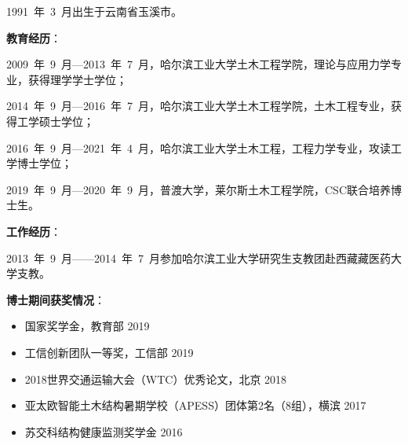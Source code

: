 
\begin{resume}
1991~年~3~月出生于云南省玉溪市。

\vspace{10pt}

\textbf{教育经历}：

2009~年~9~月---2013~年~7~月，哈尔滨工业大学土木工程学院，理论与应用力学专业，获得理学学士学位；

2014~年~9~月---2016~年~7~月，哈尔滨工业大学土木工程学院，土木工程专业，获得工学硕士学位；

2016~年~9~月---2021~年~4~月，哈尔滨工业大学土木工程，工程力学专业，攻读工学博士学位；

2019~年~9~月---2020~年~9~月，普渡大学，莱尔斯土木工程学院，CSC联合培养博士生。


\vspace{10pt}

\textbf{工作经历}：

2013~年~9~月------2014~年~7~月参加哈尔滨工业大学研究生支教团赴西藏藏医药大学支教。

\vspace{10pt}

\textbf{博士期间获奖情况}：

\begin{itemize}[label={-}] \itemsep -1pt %
\item 国家奖学金，教育部 \hfill 2019
\item 工信创新团队一等奖，工信部 \hfill 2019
\item 2018世界交通运输大会（WTC）优秀论文，北京 \hfill 2018
\item 亚太欧智能土木结构暑期学校（APESS）团体第2名（8组），横滨 \hfill 2017
\item 苏交科结构健康监测奖学金 \hfill 2016
\end{itemize}

\end{resume}
